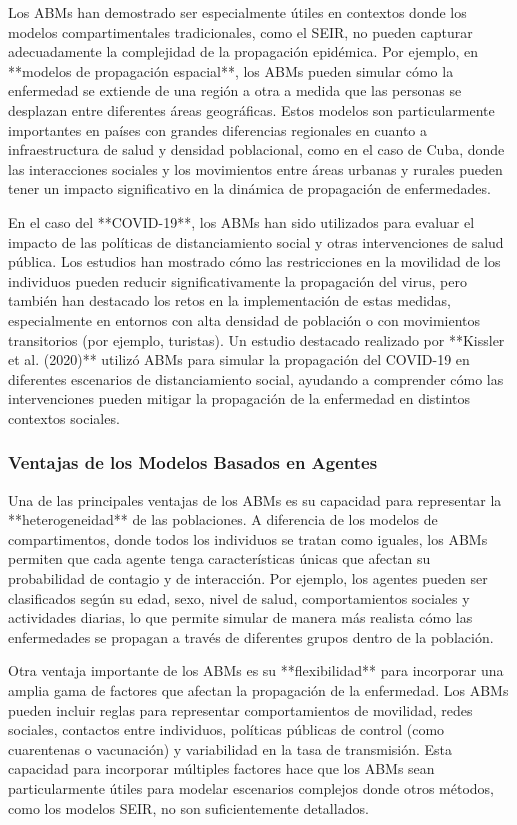 Los ABMs han demostrado ser especialmente útiles en contextos donde los modelos compartimentales tradicionales, como el SEIR, no pueden capturar adecuadamente la complejidad de la propagación epidémica. Por ejemplo, en **modelos de propagación espacial**, los ABMs pueden simular cómo la enfermedad se extiende de una región a otra a medida que las personas se desplazan entre diferentes áreas geográficas. Estos modelos son particularmente importantes en países con grandes diferencias regionales en cuanto a infraestructura de salud y densidad poblacional, como en el caso de Cuba, donde las interacciones sociales y los movimientos entre áreas urbanas y rurales pueden tener un impacto significativo en la dinámica de propagación de enfermedades.

En el caso del **COVID-19**, los ABMs han sido utilizados para evaluar el impacto de las políticas de distanciamiento social y otras intervenciones de salud pública. Los estudios han mostrado cómo las restricciones en la movilidad de los individuos pueden reducir significativamente la propagación del virus, pero también han destacado los retos en la implementación de estas medidas, especialmente en entornos con alta densidad de población o con movimientos transitorios (por ejemplo, turistas). Un estudio destacado realizado por **Kissler et al. (2020)** utilizó ABMs para simular la propagación del COVID-19 en diferentes escenarios de distanciamiento social, ayudando a comprender cómo las intervenciones pueden mitigar la propagación de la enfermedad en distintos contextos sociales.

\subsubsection{Ventajas de los Modelos Basados en Agentes}

Una de las principales ventajas de los ABMs es su capacidad para representar la **heterogeneidad** de las poblaciones. A diferencia de los modelos de compartimentos, donde todos los individuos se tratan como iguales, los ABMs permiten que cada agente tenga características únicas que afectan su probabilidad de contagio y de interacción. Por ejemplo, los agentes pueden ser clasificados según su edad, sexo, nivel de salud, comportamientos sociales y actividades diarias, lo que permite simular de manera más realista cómo las enfermedades se propagan a través de diferentes grupos dentro de la población.

Otra ventaja importante de los ABMs es su **flexibilidad** para incorporar una amplia gama de factores que afectan la propagación de la enfermedad. Los ABMs pueden incluir reglas para representar comportamientos de movilidad, redes sociales, contactos entre individuos, políticas públicas de control (como cuarentenas o vacunación) y variabilidad en la tasa de transmisión. Esta capacidad para incorporar múltiples factores hace que los ABMs sean particularmente útiles para modelar escenarios complejos donde otros métodos, como los modelos SEIR, no son suficientemente detallados.

